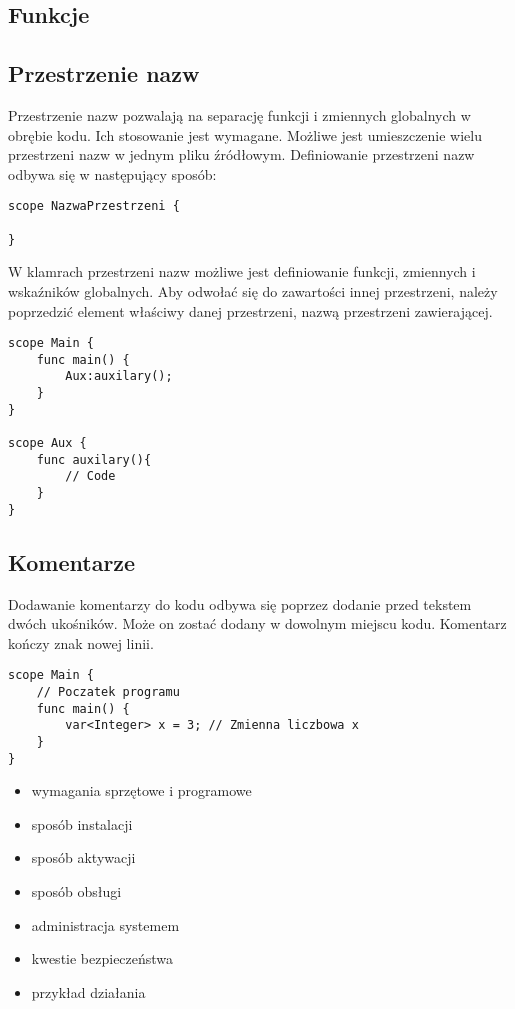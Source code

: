 \subsection{Funkcje}

\subsection{Przestrzenie nazw}
Przestrzenie nazw pozwalają na separację funkcji i zmiennych globalnych w obrębie kodu. Ich stosowanie jest wymagane. Możliwe jest umieszczenie wielu przestrzeni nazw w jednym pliku źródłowym. Definiowanie przestrzeni nazw odbywa się w następujący sposób:
\begin{lstlisting}
scope NazwaPrzestrzeni {

}
\end{lstlisting}
W klamrach przestrzeni nazw możliwe jest definiowanie funkcji, zmiennych i wskaźników globalnych. Aby odwołać się do zawartości innej przestrzeni, należy poprzedzić element właściwy danej przestrzeni, nazwą przestrzeni zawierającej.
\begin{lstlisting}
scope Main {
	func main() {
		Aux:auxilary();	
	}
}

scope Aux {
	func auxilary(){
		// Code
	}
}
\end{lstlisting}

\subsection{Komentarze}
Dodawanie komentarzy do kodu odbywa się poprzez dodanie przed tekstem dwóch ukośników. Może on zostać dodany w dowolnym miejscu kodu. Komentarz kończy znak nowej linii.
\begin{lstlisting}
scope Main {
	// Poczatek programu
	func main() {
		var<Integer> x = 3; // Zmienna liczbowa x
	}
}
\end{lstlisting}

\begin{itemize}
\item  wymagania sprzętowe i programowe
\item  sposób instalacji
\item  sposób aktywacji
\item  sposób obsługi
\item  administracja systemem
\item  kwestie bezpieczeństwa
\item  przykład działania
\end{itemize}

